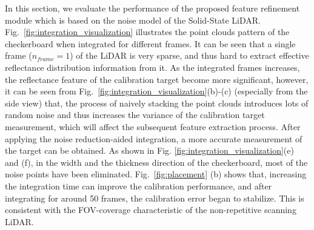 \documentclass[journal]{vgtc}
\begin{document}
In this section, we evaluate the performance of the proposed feature refinement module which is based on the noise model of the Solid-State LiDAR. Fig.~\ref{fig:integration_visualization} illustrates the point clouds pattern of the checkerboard when integrated for different frames. It can be seen that a single frame ($n_{frame}=1$) of the LiDAR is very sparse, and thus hard to extract effective reflectance distribution information from it. As the integrated frames increases, the reflectance feature of the calibration target become more significant, however, it can be seen from Fig.~\ref{fig:integration_visualization}(b)-(c) (especially from the side view) that, the process of naively stacking the point clouds introduces lots of random noise and thus increases the variance of the calibration target measurement, which will affect the subsequent feature extraction process. After applying the noise reduction-aided integration, a more accurate measurement of the target can be obtained. As shown in Fig. \ref{fig:integration_visualization}(e) and (f), in the width and the thickness direction of the checkerboard, most of the noise points have been eliminated. Fig.~\ref{fig:placement} (b) shows that, increasing the integration time can improve the calibration performance, and after integrating for around 50 frames, the calibration error began to stabilize. This is consistent with the FOV-coverage characteristic of the non-repetitive scanning LiDAR.
\end{document}
